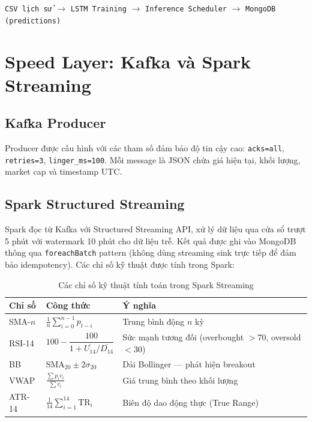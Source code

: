 \documentclass[12pt, a4paper]{report}
\begin{document}
\begin{center}
\texttt{CSV lịch sử} $\rightarrow$ \texttt{LSTM Training} $\rightarrow$
\texttt{Inference Scheduler} $\rightarrow$ \texttt{MongoDB (predictions)}
\end{center}

\section{Speed Layer: Kafka và Spark Streaming}

\subsection{Kafka Producer}

Producer được cấu hình với các tham số đảm bảo độ tin cậy cao:
\texttt{acks=all}, \texttt{retries=3}, \texttt{linger\_ms=100}. Mỗi message
là JSON chứa giá hiện tại, khối lượng, market cap và timestamp UTC.

\subsection{Spark Structured Streaming}

Spark đọc từ Kafka với Structured Streaming API, xử lý dữ liệu qua cửa sổ trượt
5 phút với watermark 10 phút cho dữ liệu trễ. Kết quả được ghi vào MongoDB thông qua
\texttt{foreachBatch} pattern (không dùng streaming sink trực tiếp để đảm bảo
idempotency). Các chỉ số kỹ thuật được tính trong Spark:

\begin{table}[H]
  \centering
  \caption{Các chỉ số kỹ thuật tính toán trong Spark Streaming}
  \label{tab:indicators}
  \begin{tabular}{llp{7cm}}
    \toprule
    Chỉ số & Công thức & Ý nghĩa \\
    \midrule
    SMA-$n$ & $\displaystyle\frac{1}{n}\sum_{i=0}^{n-1} p_{t-i}$ & Trung bình động $n$ kỳ \\[8pt]
    RSI-14  & $100 - \dfrac{100}{1 + \overline{U_{14}}/\overline{D_{14}}}$ & Sức mạnh tương đối (overbought $>$70, oversold $<$30) \\[8pt]
    BB      & $\text{SMA}_{20} \pm 2\sigma_{20}$ & Dải Bollinger --- phát hiện breakout \\[4pt]
    VWAP    & $\displaystyle\frac{\sum p_i v_i}{\sum v_i}$ & Giá trung bình theo khối lượng \\[8pt]
    ATR-14  & $\displaystyle\frac{1}{14}\sum_{i=1}^{14} \text{TR}_i$ & Biên độ dao động thực (True Range) \\
    \bottomrule
  \end{tabular}
\end{table}
\end{document}
